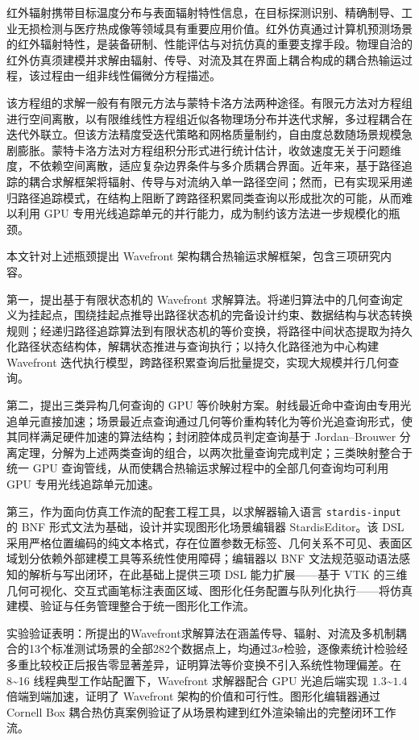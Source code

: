 \begin{CHSabstract}
红外辐射携带目标温度分布与表面辐射特性信息，在目标探测识别、精确制导、工业无损检测与医疗热成像等领域具有重要应用价值。红外仿真通过计算机预测场景的红外辐射特性，是装备研制、性能评估与对抗仿真的重要支撑手段。物理自洽的红外仿真须建模并求解由辐射、传导、对流及其在界面上耦合构成的耦合热输运过程，该过程由一组非线性偏微分方程描述。

该方程组的求解一般有有限元方法与蒙特卡洛方法两种途径。有限元方法对方程组进行空间离散，以有限维线性方程组近似各物理场分布并迭代求解，多过程耦合在迭代外联立。但该方法精度受迭代策略和网格质量制约，自由度总数随场景规模急剧膨胀。蒙特卡洛方法对方程组积分形式进行统计估计，收敛速度无关于问题维度，不依赖空间离散，适应复杂边界条件与多介质耦合界面。近年来，基于路径追踪的耦合求解框架将辐射、传导与对流纳入单一路径空间；然而，已有实现采用递归路径追踪模式，在结构上阻断了跨路径积累同类查询以形成批次的可能，从而难以利用 GPU 专用光线追踪单元的并行能力，成为制约该方法进一步规模化的瓶颈。

本文针对上述瓶颈提出 Wavefront 架构耦合热输运求解框架，包含三项研究内容。

第一，提出基于有限状态机的 Wavefront 求解算法。将递归算法中的几何查询定义为挂起点，围绕挂起点推导出路径状态机的完备设计约束、数据结构与状态转换规则；经递归路径追踪算法到有限状态机的等价变换，将路径中间状态提取为持久化路径状态结构体，解耦状态推进与查询执行；以持久化路径池为中心构建 Wavefront 迭代执行模型，跨路径积累查询后批量提交，实现大规模并行几何查询。

第二，提出三类异构几何查询的 GPU 等价映射方案。射线最近命中查询由专用光追单元直接加速；场景最近点查询通过几何等价重构转化为等价光追查询形式，使其同样满足硬件加速的算法结构；封闭腔体成员判定查询基于 Jordan--Brouwer 分离定理，分解为上述两类查询的组合，以两次批量查询完成判定；三类映射整合于统一 GPU 查询管线，从而使耦合热输运求解过程中的全部几何查询均可利用 GPU 专用光线追踪单元加速。

第三，作为面向仿真工作流的配套工程工具，以求解器输入语言 \texttt{stardis-input} 的 BNF 形式文法为基础，设计并实现图形化场景编辑器 StardisEditor。该 DSL 采用严格位置编码的纯文本格式，存在位置参数无标签、几何关系不可见、表面区域划分依赖外部建模工具等系统性使用障碍；编辑器以 BNF 文法规范驱动语法感知的解析与写出闭环，在此基础上提供三项 DSL 能力扩展——基于 VTK 的三维几何可视化、交互式画笔标注表面区域、图形化任务配置与队列化执行——将仿真建模、验证与任务管理整合于统一图形化工作流。

实验验证表明：所提出的Wavefront求解算法在涵盖传导、辐射、对流及多机制耦合的13个标准测试场景的全部282个数据点上，均通过$3\sigma$检验，逐像素统计检验经多重比较校正后报告零显著差异，证明算法等价变换不引入系统性物理偏差。在 8\textasciitilde 16 线程典型工作站配置下，Wavefront 求解器配合 GPU 光追后端实现 $1.3$\textasciitilde$1.4$ 倍端到端加速，证明了 Wavefront 架构的价值和可行性。图形化编辑器通过 Cornell Box 耦合热仿真案例验证了从场景构建到红外渲染输出的完整闭环工作流。
\end{CHSabstract}

